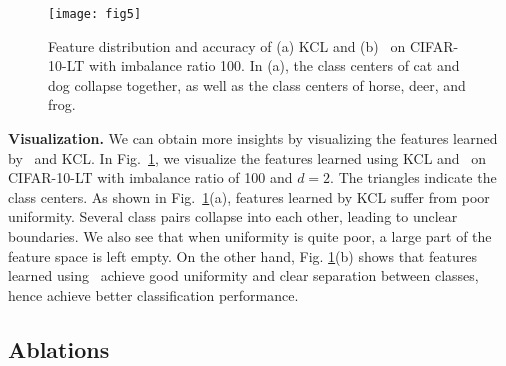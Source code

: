 \begin{figure}[h]
\begin{center}
\texttt{[image: fig5]}
\end{center}
\vspace{-7.5pt}
\caption{Feature distribution and accuracy of (a) KCL and (b) \name~on CIFAR-10-LT with imbalance ratio 100. In (a), the class centers of cat and dog collapse together, as well as the class centers of horse, deer, and frog.}
\vspace{-7.5pt}
\label{fig:viz}
\end{figure}

\textbf{Visualization.} We can obtain more insights by visualizing the features learned by \name\ and KCL. 
In Fig.~\ref{fig:viz}, we visualize the features learned using KCL and \name~on CIFAR-10-LT with imbalance ratio of 100 and $d=2$. The triangles indicate the class centers. As shown in Fig.~\ref{fig:viz}(a), features learned by KCL suffer from poor uniformity. Several class pairs collapse into each other, leading to unclear  boundaries. We also see that when uniformity is quite poor, a large part of the feature space is left empty. On the other hand, Fig. \ref{fig:viz}(b) shows that features learned using \name\ achieve good uniformity and clear separation between classes, hence achieve better classification performance.

\subsection{Ablations}
\label{subsec:ablation}

\begin{table}[h]
\caption{\small Comparison between KCL, KCL with class-balanced sampling and \name~on CIFAR-10-LT and CIFAR-100-LT.}
\vspace{-5mm}
\label{tab:cb}
\small
\begin{center}
\end{center}
\vspace{-15pt}
\end{table}

